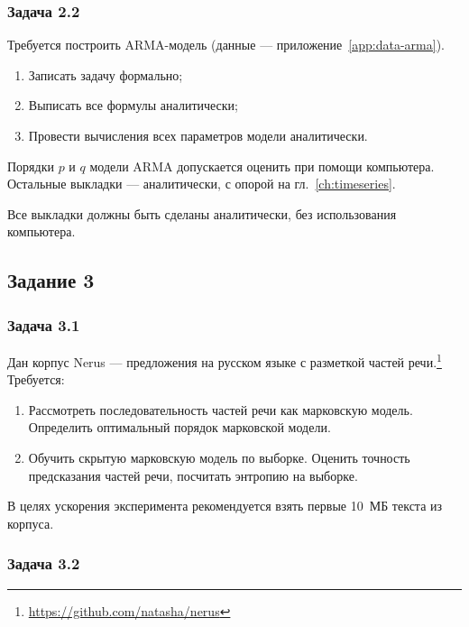\subsubsection{Задача 2.2}

Требуется построить ARMA-модель (данные --- приложение~\ref{app:data-arma}).
\begin{enumerate}
    \item Записать задачу формально;
    \item Выписать все формулы аналитически;
    \item Провести вычисления всех параметров модели аналитически.
\end{enumerate}
\begin{remark}
Порядки $p$ и $q$ модели ARMA допускается оценить при помощи компьютера. Остальные выкладки --- аналитически, с опорой на гл.~\ref{ch:timeseries}.
\end{remark}
Все выкладки должны быть сделаны аналитически, без использования компьютера.

\subsection{Задание 3}


\subsubsection{Задача 3.1}

Дан корпус Nerus --- предложения на русском языке с разметкой частей речи.\footnote{\url{https://github.com/natasha/nerus}}
Требуется:
\begin{enumerate}
    \item Рассмотреть последовательность частей речи как марковскую модель. Определить оптимальный порядок марковской модели.
    \item Обучить скрытую марковскую модель по выборке. Оценить точность предсказания частей речи, посчитать энтропию на выборке.
\end{enumerate}
\begin{remark}
В целях ускорения эксперимента рекомендуется взять первые 10~МБ текста из корпуса.
\end{remark}

\subsubsection{Задача 3.2}

